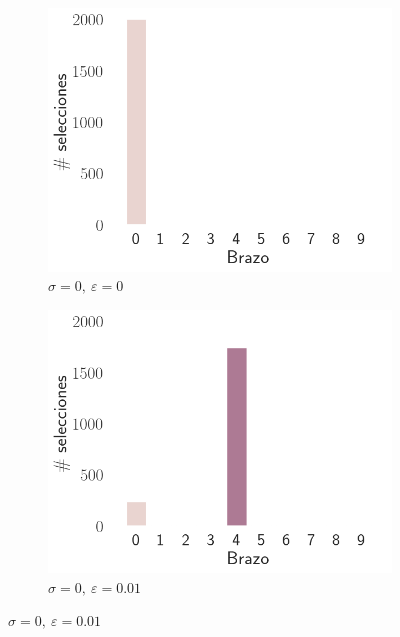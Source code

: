\documentclass[12pt]{article}
\begin{document}
    \begin{figure}[H]
        \centering
        \begin{subfigure}[H]{0.3\textwidth}
            \includegraphics[width=\textwidth]{../img/2000/arm_sigma_0_epsilon_0}
            \caption{$\sigma=0 ,\ \varepsilon=0$}
            \label{fig:arms_selected_0_0}
        \end{subfigure}
        \begin{subfigure}[H]{0.3\textwidth}
            \includegraphics[width=\textwidth]{../img/2000/arm_sigma_0_epsilon_0.01}
            \caption{$\sigma=0 ,\ \varepsilon=0.01$}
            \label{fig:arms_selected_0_0.01}
        \end{subfigure}

\end{figure}
\end{document}
